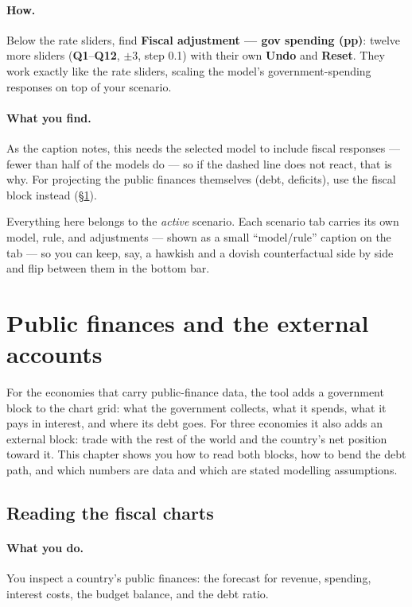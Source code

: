\documentclass[11pt]{article}
\theoremstyle{definition}
\theoremstyle{remark}
\begin{document}
\paragraph{How.} Below the rate sliders, find \textbf{Fiscal adjustment ---
gov spending (pp)}: twelve more sliders (\textbf{Q1}--\textbf{Q12}, $\pm 3$,
step 0.1) with their own \textbf{Undo} and \textbf{Reset}. They work exactly
like the rate sliders, scaling the model's government-spending responses on
top of your scenario.

\paragraph{What you find.} As the caption notes, this needs the selected
model to include fiscal responses --- fewer than half of the models do ---
so if the dashed line does not react, that is why. For projecting the public
finances themselves (debt, deficits), use the fiscal block instead
(\S\ref{sec:use-fiscal}).

Everything here belongs to the \emph{active} scenario. Each scenario tab
carries its own model, rule, and adjustments --- shown as a small
``model/rule'' caption on the tab --- so you can keep, say, a hawkish and a
dovish counterfactual side by side and flip between them in the bottom bar.

\section{Public finances and the external accounts}\label{sec:use-fiscal}

For the economies that carry public-finance data, the tool adds a government block to the
chart grid: what the government collects, what it spends, what it pays in interest, and where
its debt goes. For three economies it also adds an external block: trade with the rest of the
world and the country's net position toward it. This chapter shows you how to read both blocks,
how to bend the debt path, and which numbers are data and which are stated modelling assumptions.

\subsection{Reading the fiscal charts}

\paragraph{What you do.} You inspect a country's public finances: the forecast for revenue,
spending, interest costs, the budget balance, and the debt ratio.
\end{document}
